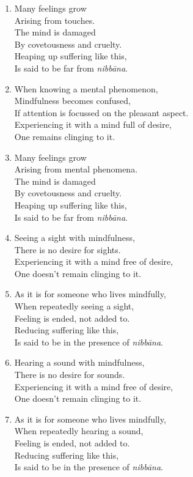 \documentclass[10pt, openany]{book}
\begin{document}
\begin{enumerate}
\item Many feelings grow\\
Arising from touches.\\
The mind is damaged\\
By covetousness and cruelty.\\
Heaping up suffering like this,\\
Is said to be far from \emph{nibbāna}.

\item When knowing a mental phenomenon, \\
Mindfulness becomes confused,\\
If attention is focussed on the pleasant aspect.\\
Experiencing it with a mind full of desire,\\
One remains clinging to it.

\item Many feelings grow\\
Arising from mental phenomena.\\
The mind is damaged\\
By covetousness and cruelty.\\
Heaping up suffering like this,\\
Is said to be far from \emph{nibbāna}.

\item Seeing a sight with mindfulness,\\
There is no desire for sights.\\
Experiencing it with a mind free of desire,\\
One doesn’t remain clinging to it.

\item As it is for someone who lives mindfully,\\
When repeatedly seeing a sight,\\
Feeling is ended, not added to.\\
Reducing suffering like this,\\
Is said to be in the presence of \emph{nibbāna}.

\item Hearing a sound with mindfulness,\\
There is no desire for sounds.\\
Experiencing it with a mind free of desire,\\
One doesn’t remain clinging to it.

\item As it is for someone who lives mindfully,\\
When repeatedly hearing a sound,\\
Feeling is ended, not added to.\\
Reducing suffering like this,\\
Is said to be in the presence of \emph{nibbāna}.


\end{enumerate}
\end{document}
